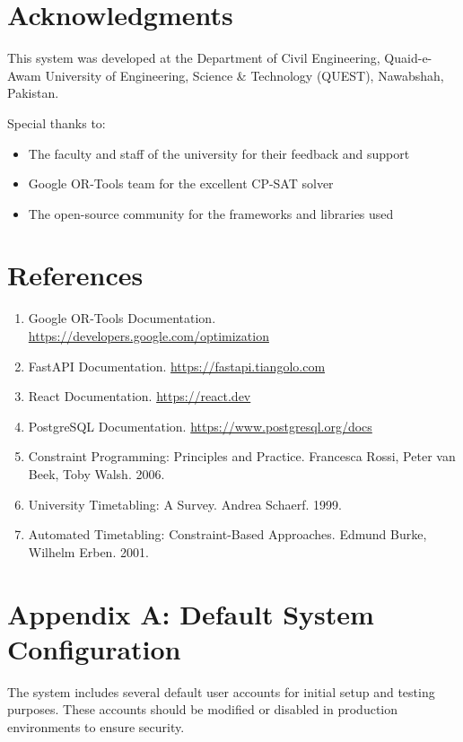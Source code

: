 \documentclass[12pt,a4paper]{article}
\begin{document}
\section{Acknowledgments}

This system was developed at the Department of Civil Engineering, Quaid-e-Awam University of Engineering, Science \& Technology (QUEST), Nawabshah, Pakistan.

Special thanks to:
\begin{itemize}
    \item The faculty and staff of the university for their feedback and support
    \item Google OR-Tools team for the excellent CP-SAT solver
    \item The open-source community for the frameworks and libraries used
\end{itemize}

\section{References}

\begin{enumerate}
    \item Google OR-Tools Documentation. \url{https://developers.google.com/optimization}
    \item FastAPI Documentation. \url{https://fastapi.tiangolo.com}
    \item React Documentation. \url{https://react.dev}
    \item PostgreSQL Documentation. \url{https://www.postgresql.org/docs}
    \item Constraint Programming: Principles and Practice. Francesca Rossi, Peter van Beek, Toby Walsh. 2006.
    \item University Timetabling: A Survey. Andrea Schaerf. 1999.
    \item Automated Timetabling: Constraint-Based Approaches. Edmund Burke, Wilhelm Erben. 2001.
\end{enumerate}

\appendix

\section{Appendix A: Default System Configuration}

The system includes several default user accounts for initial setup and testing purposes. These accounts should be modified or disabled in production environments to ensure security.
\end{document}
